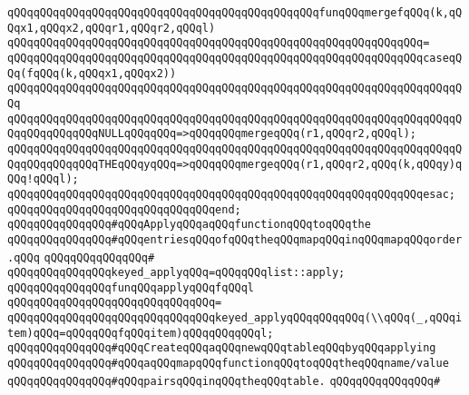 \verb|qQQqqQQqqQQqqQQqqQQqqQQqqQQqqQQqqQQqqQQqqQQqqQQqfunqQQqmergefqQQq(k,qQQqx1,qQQqx2,qQQqr1,qQQqr2,qQQql)|\newline
\verb|qQQqqQQqqQQqqQQqqQQqqQQqqQQqqQQqqQQqqQQqqQQqqQQqqQQqqQQqqQQqqQQq=|\newline
\verb|qQQqqQQqqQQqqQQqqQQqqQQqqQQqqQQqqQQqqQQqqQQqqQQqqQQqqQQqqQQqqQQqcaseqQQq(fqQQq(k,qQQqx1,qQQqx2))|\newline
\verb|qQQqqQQqqQQqqQQqqQQqqQQqqQQqqQQqqQQqqQQqqQQqqQQqqQQqqQQqqQQqqQQqqQQqqQQq|\newline
\verb|qQQqqQQqqQQqqQQqqQQqqQQqqQQqqQQqqQQqqQQqqQQqqQQqqQQqqQQqqQQqqQQqqQQqqQQqqQQqqQQqqQQqNULLqQQqqQQq=>qQQqqQQqmergeqQQq(r1,qQQqr2,qQQql);|\newline
\verb|qQQqqQQqqQQqqQQqqQQqqQQqqQQqqQQqqQQqqQQqqQQqqQQqqQQqqQQqqQQqqQQqqQQqqQQqqQQqqQQqqQQqTHEqQQqyqQQq=>qQQqqQQqmergeqQQq(r1,qQQqr2,qQQq(k,qQQqy)qQQq!qQQql);|\newline
\verb|qQQqqQQqqQQqqQQqqQQqqQQqqQQqqQQqqQQqqQQqqQQqqQQqqQQqqQQqqQQqqQQqesac;|\newline
\verb|qQQqqQQqqQQqqQQqqQQqqQQqqQQqqQQqend;|\newline
\newline
\newline
\verb|qQQqqQQqqQQqqQQq#qQQqApplyqQQqaqQQqfunctionqQQqtoqQQqthe|\newline
\verb|qQQqqQQqqQQqqQQq#qQQqentriesqQQqofqQQqtheqQQqmapqQQqinqQQqmapqQQqorder.qQQq|\newline
\verb|qQQqqQQqqQQqqQQq#|\newline
\verb|qQQqqQQqqQQqqQQqkeyed_applyqQQq=qQQqqQQqlist::apply;|\newline
\newline
\verb|qQQqqQQqqQQqqQQqfunqQQqapplyqQQqfqQQql|\newline
\verb|qQQqqQQqqQQqqQQqqQQqqQQqqQQqqQQq=|\newline
\verb|qQQqqQQqqQQqqQQqqQQqqQQqqQQqqQQqkeyed_applyqQQqqQQqqQQq(\\qQQq(_,qQQqitem)qQQq=qQQqqQQqfqQQqitem)qQQqqQQqqQQql;|\newline
\newline
\newline
\verb|qQQqqQQqqQQqqQQq#qQQqCreateqQQqaqQQqnewqQQqtableqQQqbyqQQqapplying|\newline
\verb|qQQqqQQqqQQqqQQq#qQQqaqQQqmapqQQqfunctionqQQqtoqQQqtheqQQqname/value|\newline
\verb|qQQqqQQqqQQqqQQq#qQQqpairsqQQqinqQQqtheqQQqtable.|\newline
\verb|qQQqqQQqqQQqqQQq#|\newline
